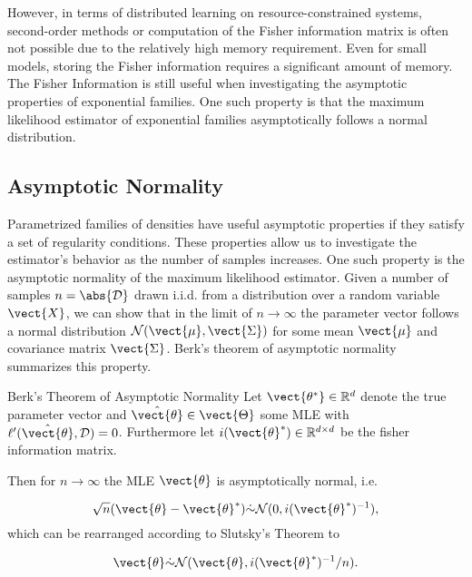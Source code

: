     However, in terms of distributed learning on resource-constrained systems, second-order methods or computation of the Fisher information matrix is often not possible due to the relatively high memory requirement.
    Even for small models, storing the Fisher information requires a significant amount of memory.
    The Fisher Information is still useful when investigating the asymptotic properties of exponential families. 
    One such property is that the maximum likelihood estimator of exponential families asymptotically follows a normal distribution.

    \subsection{Asymptotic Normality}
        \label{ssec:asymp}
        Parametrized families of densities have useful asymptotic properties if they satisfy a set of regularity conditions.
        These properties allow us to investigate the estimator's behavior as the number of samples increases. 
        One such property is the asymptotic normality of the maximum likelihood estimator.
        Given a number of samples $n = \abs{\mathcal{D}}$ drawn i.i.d. from a distribution over a random variable $\vect{X}$, we can show that in the limit of $n \rightarrow \infty$ the parameter vector follows a normal distribution $\mathcal{N}(\vect{\mu}, \vect{\Sigma})$ for some mean $\vect{\mu}$ and covariance matrix $\vect{\Sigma}$. 
        Berk's theorem of asymptotic normality summarizes this property.


        \begin{threm}{Berk's Theorem of Asymptotic Normality\cite{berk1972consistency}}
            \label{theorem:berk}
            Let $\vect{\theta^*} \in \mathbb{R}^d$ denote the true parameter vector and $\hat{\vect{\theta}} \in \vect{\Theta}$ some MLE with $\ell'(\hat{\vect{\theta}}, \mathcal{D}) = 0$.
            Furthermore let $i(\vect{\theta}^*) \in \mathbb{R}^{d \times d}$ be the fisher information matrix.

            Then for $n \rightarrow \infty$ the MLE $\vect{\theta}$ is asymptotically normal, i.e.

            \begin{equation}
                \sqrt{n}(\vect{\theta} - \vect{\theta}^*) \dot{\sim} \mathcal{N}(0, i(\vect{\theta}^*)^{-1}),
            \end{equation}
            which can be rearranged according to Slutsky's Theorem\cite{casella2002statistical} to

            \begin{equation}
                \vect{\theta} \dot{\sim} \mathcal{N}(\vect{\theta}, i(\vect{\theta}^*)^{-1}/n).
            \end{equation}
        \end{threm}


